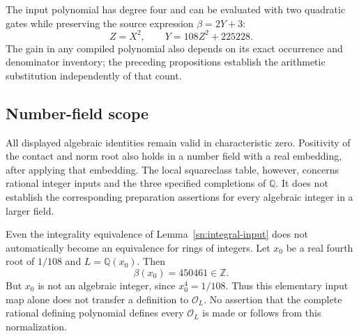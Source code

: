 The input polynomial has degree four and can be evaluated with
two quadratic gates while preserving the source expression
$\beta=2Y+3$:
\[
                    Z=X^2,\qquad Y=108Z^2+225228.
\]
The gain in any compiled polynomial also depends on its exact
occurrence and denominator inventory; the preceding propositions
establish the arithmetic substitution independently of that count.

\subsection{Number-field scope}

All displayed algebraic identities remain valid in characteristic
zero.  Positivity of the contact and norm root also holds in a
number field with a real embedding, after applying that embedding.
The local squareclass table, however, concerns rational integer
inputs and the three specified completions of $\mathbb Q$.
It does not establish the corresponding preparation assertions
for every algebraic integer in a larger field.

Even the integrality equivalence of Lemma~\ref{sn:integral-input}
does not automatically become an equivalence for rings of
integers.  Let $x_0$ be a real fourth root of $1/108$ and
$L=\mathbb Q(x_0)$.  Then
\[
                       \beta(x_0)=450461\in\mathbb Z.
\]
But $x_0$ is not an algebraic integer, since $x_0^4=1/108$.
Thus this elementary input map
alone does not transfer a definition to $\mathcal O_L$.
No assertion that the complete rational defining polynomial
defines every $\mathcal O_L$ is made or follows from this
normalization.
